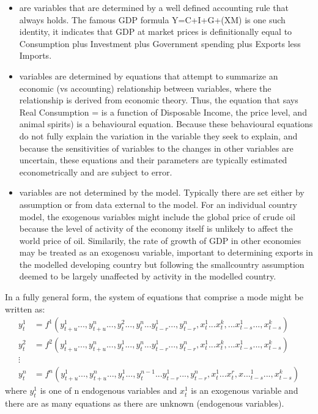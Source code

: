 \documentclass[letterpaper,10pt,english]{jupyterBook}
\begin{document}
\sphinxAtStartPar
{}
\begin{itemize}
\item {} 
\sphinxAtStartPar
{} are variables that are determined by a well defined accounting rule that always holds. The famous GDP formula Y=C+I+G+(X\sphinxhyphen{}M) is one such identity, it indicates that GDP at market prices is definitionally equal to Consumption plus Investment plus Government spending plus Exports less Imports.

\item {} 
\sphinxAtStartPar
{} variables are determined by equations that attempt to summarize an economic (vs accounting) relationship between variables, where the relationship is derived from economic theory. Thus, the equation that says Real Consumption =  is a function of Disposable Income, the price level, and animal spirits) is a behavioural equation. Because these behavioural equations do not fully explain the variation in the variable they seek to explain, and because the sensitivities of variables to the changes in other variables are uncertain, these equations and their parameters are  typically estimated econometrically and are subject to error.

\item {} 
\sphinxAtStartPar
{} variables are not determined by the model. Typically there are set either by assumption or from data external to the model.  For an individual country model, the exogenous variables might include the global price of crude oil  because the level of activity of the economy itself is unlikely to affect the world price of oil. Similarily, the rate of growth of GDP in other economies may be treated as an exogenosu variable, important to determining exports in the modelled developing country but following the small\sphinxhyphen{}country assumption deemed to be largely unaffected by activity in the modelled country.

\end{itemize}

\sphinxAtStartPar
In a fully general form, the system of equations that comprise a mode might be written as:
\begin{align*}
y_t^1  &=  f^1(y_{t+u}^1...,y_{t+u}^n...,y_t^2...,y_{t}^n...y_{t-r}^1...,y_{t-r}^n,x_t^1...x_{t}^k,...x_{t-s}^1...,x_{t-s}^k) \\
y_t^2  &=  f^2(y_{t+u}^1...,y_{t+u}^n...,y_t^1...,y_{t}^n...y_{t-r}^1...,y_{t-r}^n,x_t^1...x_{t}^k,...x_{t-s}^1...,x_{t-s}^k) \\
\vdots \\
y_t^n  &=  f^n(y_{t+u}^1...,y_{t+u}^n...,y_t^1...,y_{t}^{n-1}...y_{t-r}^1...,y_{t-r}^n,x_t^1...x_{t}^r,x..._{t-s}^1...,x_{t-s}^k)
\end{align*}
\sphinxAtStartPar
where \( y_t^1 \) is one of n endogenous variables and \(x_t^1\) is an exogenous variable and there are as many equations as there are unknown (endogenous variables).
\end{document}
